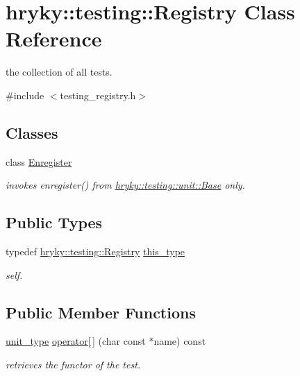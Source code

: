 \hypertarget{classhryky_1_1testing_1_1_registry}{\section{hryky\-:\-:testing\-:\-:Registry Class Reference}
\label{classhryky_1_1testing_1_1_registry}
}


the collection of all tests.  




{\ttfamily \#include $<$testing\-\_\-registry.\-h$>$}

\subsection*{Classes}
\begin{DoxyCompactItemize}
\item 
class \hyperlink{classhryky_1_1testing_1_1_registry_1_1_enregister}{Enregister}
\begin{DoxyCompactList}\small\item\em invokes enregister() from \hyperlink{classhryky_1_1testing_1_1unit_1_1_base}{hryky\-::testing\-::unit\-::\-Base} only. \end{DoxyCompactList}\end{DoxyCompactItemize}
\subsection*{Public Types}
\begin{DoxyCompactItemize}
\item 
\hypertarget{classhryky_1_1testing_1_1_registry_ab12764189072e5208e8919e31ab49aac}{typedef \hyperlink{classhryky_1_1testing_1_1_registry}{hryky\-::testing\-::\-Registry} \hyperlink{classhryky_1_1testing_1_1_registry_ab12764189072e5208e8919e31ab49aac}{this\-\_\-type}}\label{classhryky_1_1testing_1_1_registry_ab12764189072e5208e8919e31ab49aac}

\begin{DoxyCompactList}\small\item\em self. \end{DoxyCompactList}\end{DoxyCompactItemize}
\subsection*{Public Member Functions}
\begin{DoxyCompactItemize}
\item 
\hypertarget{classhryky_1_1testing_1_1_registry_aeed75a668cad923da49123e78153cac6}{\hyperlink{classhryky_1_1testing_1_1unit_1_1_base}{unit\-\_\-type} \hyperlink{classhryky_1_1testing_1_1_registry_aeed75a668cad923da49123e78153cac6}{operator\mbox{[}$\,$\mbox{]}} (char const $\ast$name) const }\label{classhryky_1_1testing_1_1_registry_aeed75a668cad923da49123e78153cac6}

\begin{DoxyCompactList}\small\item\em retrieves the functor of the test. \end{DoxyCompactList}\end{DoxyCompactItemize}
